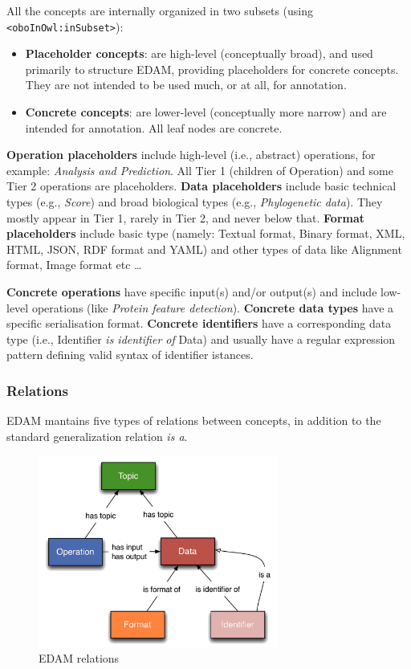 \documentclass{scrartcl}
\begin{document}
All the concepts are internally organized in two subsets (using \texttt{<oboInOwl:inSubset>}):
\begin{itemize}
  \item \textbf{Placeholder concepts}: are high-level (conceptually broad), and used primarily 
    to structure EDAM, providing placeholders for concrete concepts. 
    They are not intended to be used much, or at all, for annotation.
  \item \textbf{Concrete concepts}: are lower-level (conceptually more narrow) and are intended for annotation. 
    All leaf nodes are concrete.

\end{itemize}

\textbf{Operation placeholders} include high-level (i.e., abstract) operations, for example: 
  \textit{Analysis and Prediction}. All Tier 1 (children of Operation) and some 
  Tier 2 operations are placeholders. \textbf{Data placeholders} include basic technical types 
  (e.g., \textit{Score}) and broad biological types (e.g., \textit{ Phylogenetic data}).
  They mostly appear in Tier 1, rarely in Tier 2, and never below that.
  \textbf{Format placeholders} include basic type
    (namely: Textual format, Binary format, XML, HTML, JSON, RDF format and YAML) and 
    other types of data like Alignment format, Image format etc \dots

\textbf{Concrete operations} have specific input(s) and/or output(s) and include low-level 
  operations (like \textit{Protein feature detection}). \textbf{Concrete data types} have 
  a specific serialisation format. \textbf{Concrete identifiers} have a corresponding
  data type (i.e., Identifier \textit{is identifier of} Data) and usually have a regular 
  expression pattern defining valid syntax of identifier istances. 
 
\newpage

\subsubsection{Relations}

EDAM mantains five types of relations between concepts, 
  in addition to the standard generalization relation 
  \textit{is a}.

\begin{figure}[h!]
  \centering
  \includegraphics[width=0.7\textwidth]{imgs/EDAMrelations.png}
  \caption{EDAM relations}
  \label{fig:relations}
\end{figure}
\end{document}
